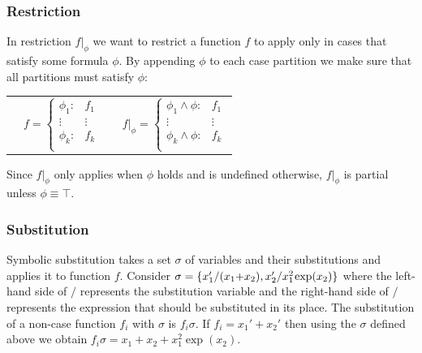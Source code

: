 \documentclass[twoside,11pt]{article}
\begin{document}
\subsubsection{Restriction}
In restriction $f|_{\phi}$ %
we want to restrict a function $f$ to apply only in cases
that satisfy some formula $\phi$.  
By appending $\phi$ to each case partition we make sure that all partitions must satisfy $\phi$:

{%
\begin{center}
\begin{tabular}{r c c l}
&
\hspace{-6mm} 
  $f = \begin{cases}
    \phi_1: & f_1 \\ 
   \vdots&\vdots\\ 
    \phi_k: & f_k \\ 
  \end{cases}$
&

&
\hspace{-2mm}
  $f|_{\phi} = \begin{cases}
    \phi_1 \land \phi : & f_1 \\ 
   \vdots&\vdots\\ 
    \phi_k \land \phi : & f_k \\ 
  \end{cases}$
\end{tabular}
\end{center}
}
Since $f|_{\phi}$ only applies when $\phi$ holds and is
undefined otherwise, $f|_{\phi}$ is partial unless $\phi \equiv \top$.

\subsubsection{Substitution}
Symbolic substitution takes
a set $\sigma$ of variables and their substitutions and applies it to function $f$. 
Consider $\sigma = \{ x_1' / (x_1 \hspace{-.8mm} + \hspace{-.8mm} x_2), x_2' / x_1^2 \hspace{-.3mm} \exp(x_2) \}$
where the left-hand side of $/$ represents the substitution variable and the
right-hand side of $/$ represents the expression that should be substituted in its place.  
The substitution of a non-case function $f_i$ with $\sigma$ 
is $f_i\sigma$. If
$f_i = x_1' + x_2'$ then using the $\sigma$ defined above we obtain $f_i\sigma = x_1 + x_2 + x_1^2 \exp(x_2)$.  
\end{document}
